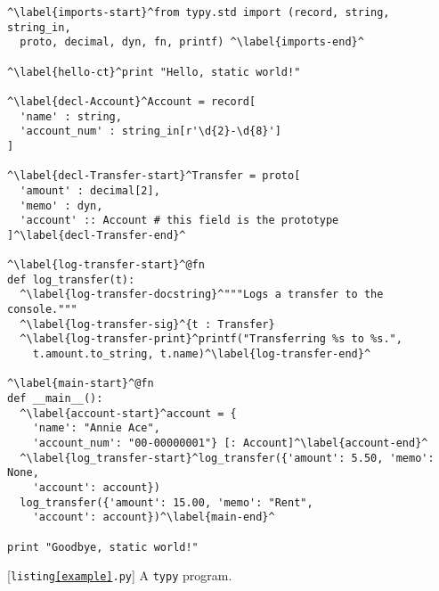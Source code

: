 \documentclass[preprint,10pt]{sigplanconf}
\begin{document}
\begin{codelisting}[t]
\begin{lstlisting}
^\label{imports-start}^from typy.std import (record, string, string_in, 
  proto, decimal, dyn, fn, printf) ^\label{imports-end}^

^\label{hello-ct}^print "Hello, static world!"

^\label{decl-Account}^Account = record[ 
  'name' : string, 
  'account_num' : string_in[r'\d{2}-\d{8}']
]

^\label{decl-Transfer-start}^Transfer = proto[
  'amount' : decimal[2], 
  'memo' : dyn,
  'account' :: Account # this field is the prototype
]^\label{decl-Transfer-end}^

^\label{log-transfer-start}^@fn
def log_transfer(t):
  ^\label{log-transfer-docstring}^"""Logs a transfer to the console."""
  ^\label{log-transfer-sig}^{t : Transfer}
  ^\label{log-transfer-print}^printf("Transferring %s to %s.", 
    t.amount.to_string, t.name)^\label{log-transfer-end}^

^\label{main-start}^@fn
def __main__():
  ^\label{account-start}^account = {
    'name': "Annie Ace", 
    'account_num': "00-00000001"} [: Account]^\label{account-end}^
  ^\label{log_transfer-start}^log_transfer({'amount': 5.50, 'memo': None, 
    'account': account})
  log_transfer({'amount': 15.00, 'memo': "Rent",
    'account': account})^\label{main-end}^
  
print "Goodbye, static world!"
\end{lstlisting}
\caption{[\texttt{listing\ref{example}.py}] A \texttt{typy} program.}
\label{example}
\end{codelisting}
\end{document}
